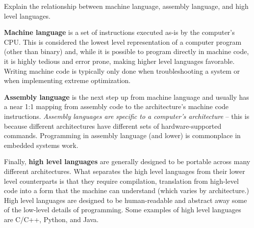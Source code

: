 Explain the relationship between machine language, assembly language, and high level languages.\\
\begin{answer}
\small{\textbf{Machine language} is a set of instructions executed as-is by the computer's CPU. This is considered the lowest level representation of a computer program (other than binary) and, while it is possible to program directly in machine code, it is highly tedious and error prone, making higher level languages favorable. Writing machine code is typically only done when troubleshooting a system or when implementing extreme optimization.

\textbf{Assembly language} is the next step up from machine language and usually has a near 1:1 mapping from assembly code to the architecture's machine code instructions. \textit{Assembly languages are specific to a computer's architecture} -- this is because different architectures have different sets of hardware-supported commands. Programming in assembly language (and lower) is commonplace in embedded systems work.


Finally, \textbf{high level languages} are generally designed to be portable across many different architectures. What separates the high level languages from their lower level counterparts is that they require compilation, translation from high-level code into a form that the machine can understand (which varies by architecture.) High level languages are designed to be human-readable and abstract away some of the low-level details of programming. Some examples of high level languages are C/C++, Python, and Java.}
\end{answer}
